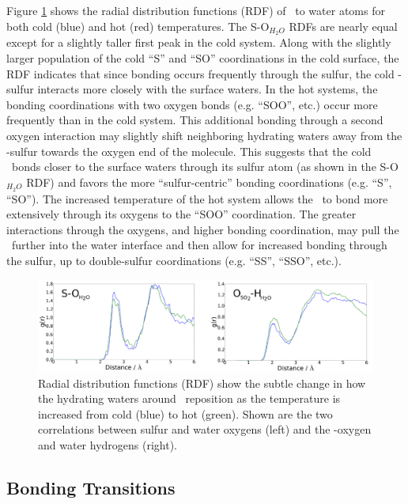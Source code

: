 Figure \ref{fig:rdf} shows the radial distribution functions (RDF) of \suldiox~to water atoms for both cold (blue) and hot (red) temperatures. The S-O$_{H_2O}$ RDFs are nearly equal except for a slightly taller first peak in the cold system. Along with the slightly larger population of the cold ``S'' and ``SO'' coordinations in the cold surface, the RDF indicates that since bonding occurs frequently through the sulfur, the cold \suldiox-sulfur interacts more closely with the surface waters. In the hot systems, the bonding coordinations with two oxygen bonds (e.g. ``SOO'', etc.) occur more frequently than in the cold system. This additional bonding through a second oxygen interaction may slightly shift neighboring hydrating waters away from the \suldiox-sulfur towards the oxygen end of the molecule. This suggests that the cold \suldiox~bonds closer to the surface waters through its sulfur atom (as shown in the S-O$_{H_2O}$ RDF) and favors the more ``sulfur-centric'' bonding coordinations (e.g. ``S'', ``SO''). The increased temperature of the hot system allows the \suldiox~to bond more extensively through its oxygens to the ``SOO'' coordination. The greater interactions through the oxygens, and higher bonding coordination, may pull the \suldiox~further into the water interface and then allow for increased bonding through the sulfur, up to double-sulfur coordinations (e.g. ``SS'', ``SSO'', etc.).

\begin{figure}[h!]
	\begin{center}
		\includegraphics[scale=1.0]{images/rdf/rdf-small.png}
		\caption{Radial distribution functions (RDF) show the subtle change in how the hydrating waters around \suldiox~reposition as the temperature is increased from cold (blue) to hot (green). Shown are the two correlations between sulfur and water oxygens (left) and the \suldiox-oxygen and water hydrogens (right).}
		\label{fig:rdf}
	\end{center}
\end{figure}

\subsection {Bonding Transitions}

